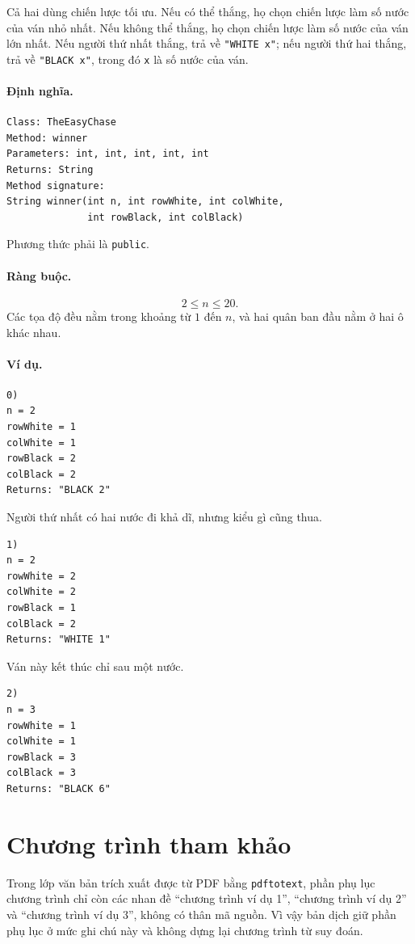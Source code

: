 \documentclass[11pt]{article}
\begin{document}
Cả hai dùng chiến lược tối ưu. Nếu có thể thắng, họ chọn chiến lược làm số
nước của ván nhỏ nhất. Nếu không thể thắng, họ chọn chiến lược làm số nước
của ván lớn nhất. Nếu người thứ nhất thắng, trả về \texttt{"WHITE x"}; nếu
người thứ hai thắng, trả về \texttt{"BLACK x"}, trong đó \texttt{x} là số nước
của ván.

\paragraph{Định nghĩa.}
\begin{verbatim}
Class: TheEasyChase
Method: winner
Parameters: int, int, int, int, int
Returns: String
Method signature:
String winner(int n, int rowWhite, int colWhite,
              int rowBlack, int colBlack)
\end{verbatim}
Phương thức phải là \texttt{public}.

\paragraph{Ràng buộc.}
\[
  2\le n\le 20.
\]
Các tọa độ đều nằm trong khoảng từ \(1\) đến \(n\), và hai quân ban đầu nằm ở
hai ô khác nhau.

\paragraph{Ví dụ.}
\begin{verbatim}
0)
n = 2
rowWhite = 1
colWhite = 1
rowBlack = 2
colBlack = 2
Returns: "BLACK 2"
\end{verbatim}
Người thứ nhất có hai nước đi khả dĩ, nhưng kiểu gì cũng thua.

\begin{verbatim}
1)
n = 2
rowWhite = 2
colWhite = 2
rowBlack = 1
colBlack = 2
Returns: "WHITE 1"
\end{verbatim}
Ván này kết thúc chỉ sau một nước.

\begin{verbatim}
2)
n = 3
rowWhite = 1
colWhite = 1
rowBlack = 3
colBlack = 3
Returns: "BLACK 6"
\end{verbatim}

\section{Chương trình tham khảo}

Trong lớp văn bản trích xuất được từ PDF bằng \texttt{pdftotext}, phần phụ lục
chương trình chỉ còn các nhan đề ``chương trình ví dụ 1'', ``chương trình ví
dụ 2'' và ``chương trình ví dụ 3'', không có thân mã nguồn. Vì vậy bản dịch
giữ phần phụ lục ở mức ghi chú này và không dựng lại chương trình từ suy đoán.
\end{document}
